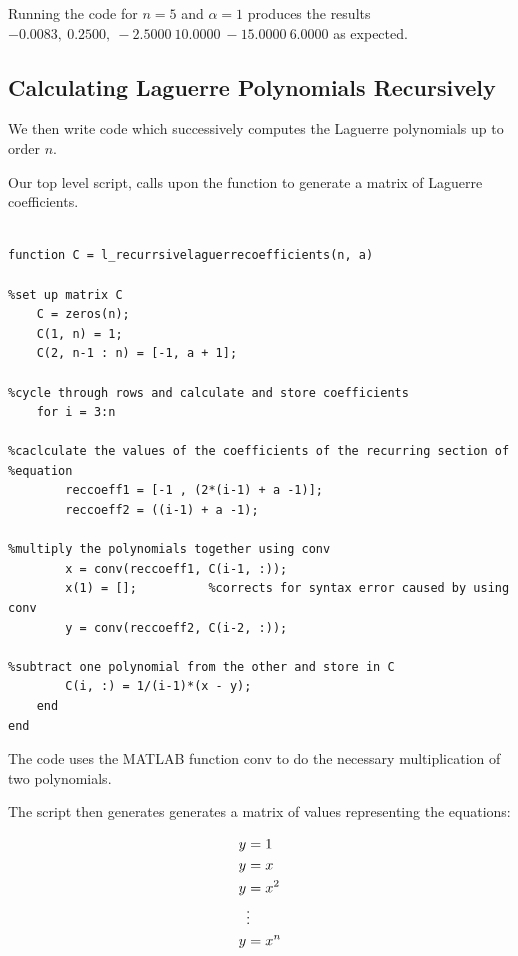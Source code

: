 \documentclass{article}
\begin{document}
Running the code for $ n = 5 $ and $ \alpha = 1 $ produces the results $-0.0083,\  0.2500,\  -2.5000\  10.0000\  -15.0000\  6.0000$ as expected. 



















\subsection{Calculating Laguerre Polynomials Recursively}

We then write code which successively computes the Laguerre polynomials up to order $ n $.

Our top level script,  calls upon the function  to generate a matrix of Laguerre coefficients.  

\begin{lstlisting}

function C = l_recurrsivelaguerrecoefficients(n, a)

%set up matrix C
    C = zeros(n);
    C(1, n) = 1;
    C(2, n-1 : n) = [-1, a + 1];

%cycle through rows and calculate and store coefficients
    for i = 3:n
        
%caclculate the values of the coefficients of the recurring section of
%equation
        reccoeff1 = [-1 , (2*(i-1) + a -1)];
        reccoeff2 = ((i-1) + a -1);
        
%multiply the polynomials together using conv
        x = conv(reccoeff1, C(i-1, :));
        x(1) = [];          %corrects for syntax error caused by using conv
        y = conv(reccoeff2, C(i-2, :));
        
%subtract one polynomial from the other and store in C
        C(i, :) = 1/(i-1)*(x - y);
    end
end
\end{lstlisting}

The code uses the MATLAB function conv to do the necessary multiplication of two polynomials. 

The script then generates generates a matrix of values representing the equations:

$$
\begin{aligned}
y &= 1 \\
y &= x \\
y &= x^2 \\
&\vdots \\
y &= x^n
\end{aligned} \\
$$
\end{document}
